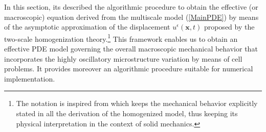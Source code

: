  In this section, its described the algorithmic procedure to obtain the effective (or macroscopic) equation derived from the multiscale model (\ref{MainPDE}) by means of the asymptotic approximation of the displacement $u^{\epsilon}(\mathbf{x},t)$ proposed by the two-scale homogenization theory.\footnote{The notation is inspired from \cite{altenbach2018generalized} which keeps the mechanical behavior explicitly stated in all the derivation of the homogenized model, thus keeping its physical interpretation in the context of solid mechanics.} This framework enables us to obtain an effective PDE model governing the overall macroscopic mechanical behavior that incorporates the highly oscillatory microstructure variation by means of cell problems. It provides moreover an algorithmic procedure suitable for numerical implementation.

